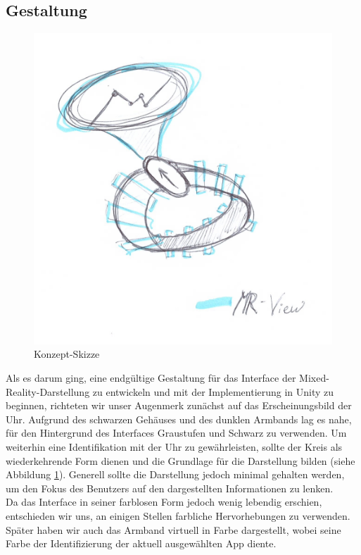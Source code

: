 \documentclass[11pt, a4paper]{article}
\begin{document}
\subsection{Gestaltung}

\begin{figure}
    \centering
	\includegraphics[scale=.115]{doc/assets/Concept-Sketch.jpg}
	\caption{Konzept-Skizze}
	\label{fig:early_sketch_of_visualization}
\end{figure}

Als es darum ging, eine endgültige Gestaltung für das Interface der Mixed-Reality-Darstellung zu entwickeln und mit der Implementierung in Unity zu beginnen, richteten wir unser Augenmerk zunächst auf das Erscheinungsbild der Uhr. Aufgrund des schwarzen Gehäuses und des dunklen Armbands lag es nahe, für den Hintergrund des Interfaces Graustufen und Schwarz zu verwenden. Um weiterhin eine Identifikation mit der Uhr zu gewährleisten, sollte der Kreis als wiederkehrende Form dienen und die Grundlage für die Darstellung bilden (siehe Abbildung \ref{fig:early_sketch_of_visualization}). Generell sollte die Darstellung jedoch minimal gehalten werden, um den Fokus des Benutzers auf den dargestellten Informationen zu lenken.\\
Da das Interface in seiner farblosen Form jedoch wenig lebendig erschien, entschieden wir uns, an einigen Stellen farbliche Hervorhebungen zu verwenden. Später haben wir auch das Armband virtuell in Farbe dargestellt, wobei seine Farbe der Identifizierung der aktuell ausgewählten App diente.
\end{document}
